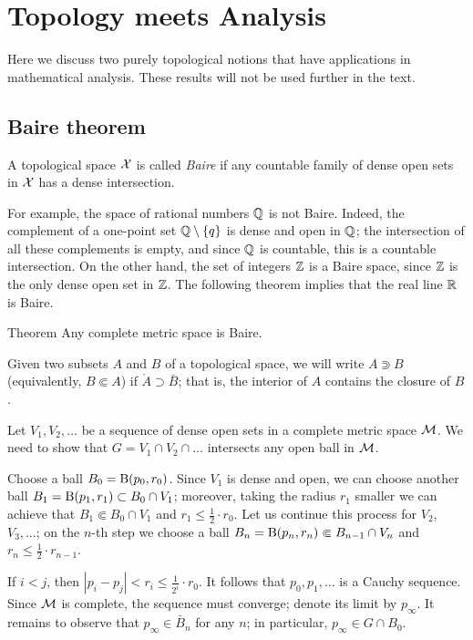 \chapter{Topology meets Analysis}\label{chap:baire}

Here we discuss two purely topological notions that have applications in mathematical analysis.
These results will not be used further in the text.

\section{Baire theorem}

A topological space $\mathcal{X}$ is called \emph{Baire} if any countable family of dense open sets in $\mathcal{X}$ has a dense intersection.

For example, the space of rational numbers $\mathbb{Q}$ is not Baire.
Indeed, the complement of a one-point set $\mathbb{Q}\setminus \{q\}$ is dense and open in $\mathbb{Q}$;
the intersection of all these complements is empty, and since $\mathbb{Q}$ is countable, this is a countable intersection.
On the other hand, the set of integers $\mathbb{Z}$ is a Baire space, since $\mathbb{Z}$ is the only dense open set in $\mathbb{Z}$.
The following theorem implies that the real line $\mathbb{R}$ is Baire.

\begin{thm}{Theorem}\label{thm:baire-category}
Any complete metric space is Baire.
\end{thm}

Given two subsets $A$ and $B$ of a topological space, we will write $A\Supset B$ (equivalently, $B\Subset A$) if $\mathring{A}\supset \bar B$; that is, the interior of $A$ contains the closure of $B$.

Let $V_1,V_2,\ldots$ be a sequence of dense open sets in a complete metric space $\mathcal{M}$.
We need to show that $G=V_1\cap V_2\cap\ldots$ intersects any open ball in $\mathcal{M}$.

Choose a ball $B_0=\mathrm{B}(p_0,r_0)$.
Since $V_1$ is dense and open, we can choose another ball $B_1=\mathrm{B}(p_1,r_1)\subset B_0\cap V_1$;
moreover, taking the radius $r_1$ smaller we can achieve that $B_1\Subset B_0\cap V_1$ and $r_1\le\tfrac12\cdot r_0$.
Let us continue this process for $V_2$, $V_3,\dots$;
on the $n$-th step we choose a ball $B_n=\mathrm{B}(p_n,r_n)\Subset B_{n-1}\cap V_n$ and $r_n\le\tfrac12\cdot r_{n-1}$.

If $i<j$, then $|p_i-p_j|<r_i\le\tfrac 1{2^i}\cdot r_0$.
It follows that $p_0,p_1,\ldots$ is a Cauchy sequence.
Since $\mathcal{M}$ is complete, the sequence must converge; denote its limit by $p_\infty$.
It remains to observe that $p_\infty\in \bar B_n$ for any $n$; in particular, $p_\infty\in G\cap B_0$.
\qeds

